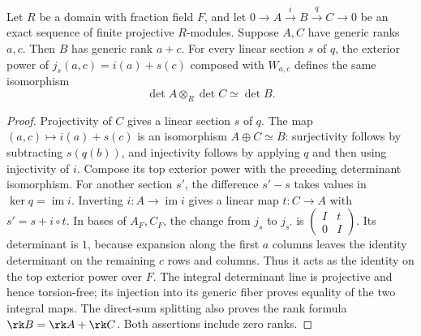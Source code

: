 \begin{lemma}
\label{lem:exact-determinant-algebra}
\leanok
Let $R$ be a domain with fraction field $F$, and let
$0\to A\xrightarrow{i}B\xrightarrow{q}C\to0$ be an exact sequence
of finite projective $R$-modules. Suppose $A,C$ have generic ranks $a,c$.
Then $B$ has generic rank $a+c$. For every linear section $s$ of $q$, the exterior power of
$j_s(a,c)=i(a)+s(c)$ composed with $W_{a,c}$ defines the same isomorphism
\[
 \det A\otimes_R\det C\simeq\det B.
\]
\end{lemma}
\begin{proof}
Projectivity of $C$ gives a linear section $s$ of $q$.
The map $(a,c)\mapsto i(a)+s(c)$ is an isomorphism $A\oplus C\simeq B$:
surjectivity follows by subtracting $s(q(b))$, and injectivity follows by
applying $q$ and then using injectivity of $i$.
Compose its top exterior power with the preceding determinant isomorphism.
For another section $s'$, the difference $s'-s$ takes values in
$\ker q=\operatorname{im}i$. Inverting $i:A\to\operatorname{im}i$
gives a linear map $t:C\to A$ with $s'=s+i\circ t$.
In bases of $A_F,C_F$, the change from $j_s$ to $j_{s'}$ is
$\left(\begin{smallmatrix}I&t\\0&I\end{smallmatrix}\right)$.
Its determinant is $1$, because expansion along the first $a$ columns
leaves the identity determinant on the remaining $c$ rows and columns.
Thus it acts as the identity on the top exterior power over $F$.
The integral determinant line is projective and hence torsion-free;
its injection into its generic fiber proves equality of the two integral maps.
The direct-sum splitting also proves the rank formula $\rk B=\rk A+\rk C$.
Both assertions include zero ranks.
\end{proof}

